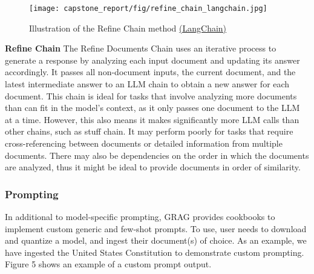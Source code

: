 \documentclass{scrartcl}
\begin{document}
\begin{figure}[H]
    \centering
    \texttt{[image: capstone\_report/fig/refine\_chain\_langchain.jpg]}
    \caption{Illustration of the Refine Chain method \href{https://readmedium.com/en/https:/ogre51.medium.com/types-of-chains-in-langchain-823c8878c2e9}{(LangChain)}}
\end{figure}
\newline
\textbf{Refine Chain}
\newline
\newline
The Refine Documents Chain uses an iterative process to generate a response by analyzing each input document and updating its answer accordingly.
It passes all non-document inputs, the current document, and the latest intermediate answer to an LLM chain to obtain a new answer for each document.
\newline
\newline
This chain is ideal for tasks that involve analyzing more documents than can fit in the model’s context, as it only passes one document to the LLM at a time.
\newline
However, this also means it makes significantly more LLM calls than other chains, such as stuff chain. It may perform poorly for tasks that require cross-referencing between documents or detailed information from multiple documents.
\newline
\newline
There may also be dependencies on the order in which the documents are analyzed, thus it might be ideal to provide documents in order of similarity.


\subsubsection{Prompting}
\newline
\newline
In additional to model-specific prompting, GRAG provides cookbooks to implement custom generic and few-shot prompts. To use, user needs to download and quantize a model, and ingest their document(s) of choice. As an example, we have ingested the United States Constitution to demonstrate custom prompting. Figure 5 shows an example of a custom prompt output.
\end{document}
